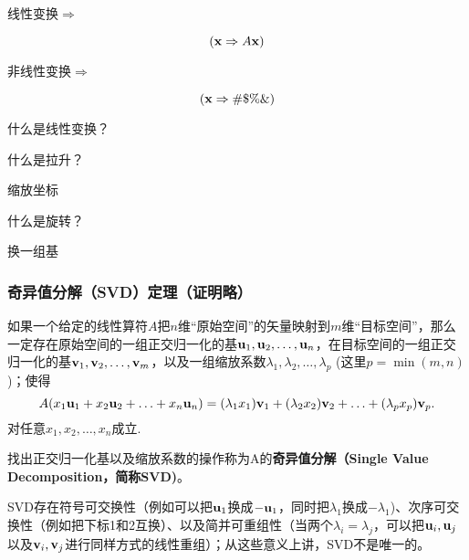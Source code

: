 \documentclass[CJK,13pt]{beamer}
\begin{document}
\begin{frame}
  \emini

  线性变换$\Rightarrow$

  $$({\mathbf{x}} \Rightarrow A{\mathbf{x}})$$

  \skiplines

  \skiplines

  \skiplines  

  非线性变换$\Rightarrow$

  $$({\mathbf{x}} \Rightarrow \#\$\%\&)$$
  \emini

  \skipline
  
  \emini
\end{frame}


\begin{frame}

  \question 什么是线性变换？
  

  \question 什么是拉升？
  
  \answer 缩放坐标

  \question 什么是旋转？

  \answer 换一组基
\end{frame}
  


\begin{frame}
  \frametitle{奇异值分解（SVD）定理（证明略）}

  如果一个给定的线性算符$A$把$n$维“原始空间”的矢量映射到$m$维“目标空间”，那么一定存在原始空间的一组正交归一化的基${\mathbf{u}}_1, {\mathbf{u}}_2,\ldots, {\mathbf{u}}_n$，在目标空间的一组正交归一化的基${\mathbf{v}}_1,{\mathbf{v}}_2,\ldots, {\mathbf{v}}_m$，以及一组缩放系数$\lambda_1,\lambda_2,\ldots,\lambda_p$ (这里$p=\min(m,n)$)；使得
    $$A(x_1{\mathbf{u}}_1+x_2{\mathbf{u}}_2+\ldots+x_n{\mathbf{u}}_n) = (\lambda_1x_1){\mathbf{v}}_1+(\lambda_2x_2){\mathbf{v}}_2+\ldots+(\lambda_px_p){\mathbf{v}}_p.$$
    对任意$x_1,x_2,\ldots, x_n$成立.

  \skipline

找出正交归一化基以及缩放系数的操作称为A的{\bf 奇异值分解（Single Value Decomposition，简称SVD)}。

    \skipline
  
 {\scriptsize SVD存在符号可交换性（例如可以把${\mathbf{u}}_1$换成$-{\mathbf{u}}_1$，同时把$\lambda_1$换成$-\lambda_1$)、次序可交换性（例如把下标1和2互换）、以及简并可重组性（当两个$\lambda_i=\lambda_j$，可以把${\mathbf{u}}_i, {\mathbf{u}}_j$以及${\mathbf{v}}_i,{\mathbf{v}}_j$进行同样方式的线性重组）；从这些意义上讲，SVD不是唯一的。}

\end{frame}
\end{document}
